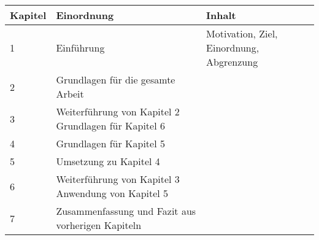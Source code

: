 \begin{tabular}{|p{}|p{5cm}|p{7cm}|}
    \hline
    \textbf{Kapitel} & \textbf{Einordnung} & \textbf{Inhalt} \\ \hline \hline
    1 & Einführung & Motivation, Ziel, Einordnung, Abgrenzung \\ \hline
    2 & Grundlagen für die gesamte Arbeit &  \\ \hline
    3 & Weiterführung von Kapitel 2 \newline Grundlagen für Kapitel 6 &  \\ \hline
    4 & Grundlagen für Kapitel 5 &  \\ \hline
    5 & Umsetzung zu Kapitel 4 &  \\ \hline
    6 & Weiterführung von Kapitel 3 \newline Anwendung von Kapitel 5 &  \\ \hline
    7 & Zusammenfassung und Fazit aus vorherigen Kapiteln &  \\ \hline
\end{tabular}
